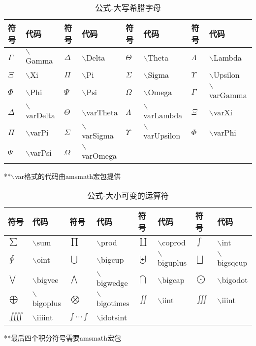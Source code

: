 \documentclass[UTF8,fontset=ubuntu]{ctexart}
\begin{document}
\begin{table}
\begin{tabular}{l l l l l l l l}
	\hline
	符号 & 代码 & 符号 & 代码 & 符号 & 代码 & 符号 & 代码\\
	\hline
	$\Gamma$ & $\backslash$Gamma & $\Delta$ & $\backslash$Delta & $\Theta$ & $\backslash$Theta & $\Lambda$ & $\backslash$Lambda\\
	$\Xi$ & $\backslash$Xi & $\Pi$ & $\backslash$Pi & $\Sigma$ & $\backslash$Sigma & $\Upsilon$ & $\backslash$Upsilon\\
	$\Phi$ & $\backslash$Phi & $\Psi$ & $\backslash$Psi & $\Omega$ & $\backslash$Omega & $\varGamma$ & $\backslash$varGamma\\
	$\varDelta$ & $\backslash$varDelta & $\varTheta$ & $\backslash$varTheta & $\varLambda$ & $\backslash$varLambda & $\varXi$ & $\backslash$varXi\\
	$\varPi$ & $\backslash$varPi & $\varSigma$ & $\backslash$varSigma & $\varUpsilon$ & $\backslash$varUpsilon & $\varPhi$ & $\backslash$varPhi\\
	$\varPsi$ & $\backslash$varPsi & $\varOmega$ & $\backslash$varOmega\\
\end{tabular}
**$\backslash$var格式的代码由amsmath宏包提供
\caption{公式-大写希腊字母}
\end{table}
\begin{table}
\begin{tabular}{l l l l l l l l}
	\hline
	符号 & 代码 & 符号 & 代码 & 符号 & 代码 & 符号 & 代码\\
	\hline
	$\sum$ & $\backslash$sum & $\prod$ & $\backslash$prod & $\coprod$ & $\backslash$coprod & $\int$ & $\backslash$int\\
	$\oint$ & $\backslash$oint & $\bigcup$ & $\backslash$bigcup & $\biguplus$ & $\backslash$biguplus & $\bigsqcup$ & $\backslash$bigsqcup\\
	$\bigvee$ & $\backslash$bigvee & $\bigwedge$ & $\backslash$bigwedge & $\bigcap$ & $\backslash$bigcap & $\bigodot$ & $\backslash$bigodot\\
	$\bigoplus$ & $\backslash$bigoplus & $\bigotimes$ & $\backslash$bigotimes & $\iint$ & $\backslash$iint & $\iiint$ & $\backslash$iiint\\
	$\iiiint$ & $\backslash$iiiint & $\idotsint$ & $\backslash$idotsint\\
\end{tabular}
**最后四个积分符号需要amsmath宏包
\caption{公式-大小可变的运算符}
\end{table}
\end{document}
